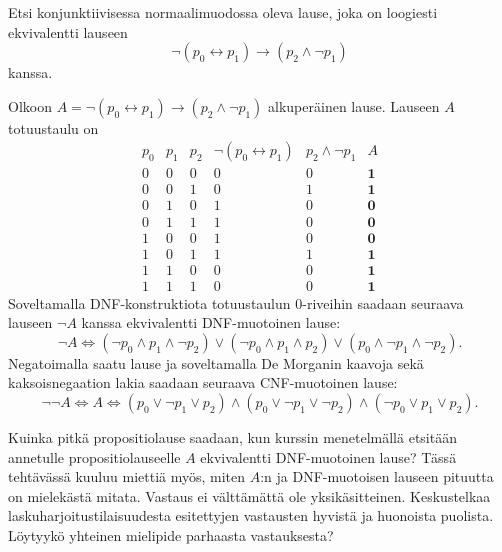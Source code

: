 \documentclass[11pt,a4paper]{amsart}
\begin{document}
\begin{exercise}
Etsi konjunktiivisessa normaalimuodossa oleva lause, joka on loogiesti
ekvivalentti lauseen
\[
\neg(p_0 \leftrightarrow p_1) \rightarrow (p_2 \land \neg p_1)
\]
kanssa.
\end{exercise}

\begin{solution}
Olkoon \(A = \neg(p_0 \leftrightarrow p_1) \rightarrow
(p_2 \land \neg p_1)\) alkuperäinen lause.
Lauseen \(A\) totuustaulu on
\[
\begin{array}{ccc|cc|c}
p_0 & p_1 & p_2 & \neg(p_0 \leftrightarrow p_1)
& p_2 \land \neg p_1 & A \\
\hline
0 & 0 & 0 & 0 & 0 & \mathbf{1} \\
0 & 0 & 1 & 0 & 1 & \mathbf{1} \\
0 & 1 & 0 & 1 & 0 & \mathbf{0} \\
0 & 1 & 1 & 1 & 0 & \mathbf{0} \\
1 & 0 & 0 & 1 & 0 & \mathbf{0} \\
1 & 0 & 1 & 1 & 1 & \mathbf{1} \\
1 & 1 & 0 & 0 & 0 & \mathbf{1} \\
1 & 1 & 1 & 0 & 0 & \mathbf{1}
\end{array}
\]
Soveltamalla DNF-konstruktiota
totuustaulun 0-riveihin saadaan seuraava lauseen \(\neg A\) kanssa
ekvivalentti DNF-muotoinen lause:
\[
\neg A \iff (\neg p_0 \land p_1 \land \neg p_2) \lor (\neg p_0 \land
p_1 \land p_2)
\lor (p_0 \land \neg p_1 \land \neg p_2).
\]
Negatoimalla saatu lause ja soveltamalla De Morganin kaavoja sekä
kaksoisnegaation lakia saadaan seuraava CNF-muotoinen lause:
\[
\neg \neg A \iff A \iff (p_0 \lor \neg p_1 \lor p_2) \land (p_0 \lor
\neg p_1 \lor \neg p_2)
\land (\neg p_0 \lor p_1 \lor p_2).
\]
\end{solution}

\begin{exercise}
Kuinka pitkä propositiolause saadaan, kun kurssin menetelmällä etsitään
annetulle propositiolauseelle \(A\) ekvivalentti DNF-muotoinen lause? Tässä
tehtävässä kuuluu miettiä myös, miten \(A\):n ja DNF-muotoisen lauseen
pituutta on mielekästä mitata. Vastaus ei välttämättä ole yksikäsitteinen.
Keskustelkaa laskuharjoitustilaisuudesta esitettyjen vastausten hyvistä ja
huonoista puolista. Löytyykö yhteinen mielipide parhaasta vastauksesta?
\end{exercise}
\end{document}
